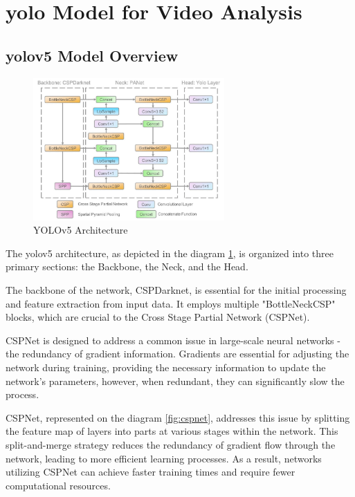 \section{\ac{yolo} Model for Video Analysis}
\subsection{\ac{yolo}v5 Model Overview}
\begin{figure}[h]
    \centering 
    \includegraphics[width=0.65\textwidth]{figs/yolov5-architecture2.png} 
    \caption{YOLOv5 Architecture}
    \label{fig:yolov5-architecture}
\end{figure}
The \ac{yolo}v5 architecture, as depicted in the diagram \ref{fig:yolov5-architecture}, is organized into 
three primary sections: the Backbone, the Neck, and the Head.

The backbone of the network, CSPDarknet, is essential for the initial processing and feature extraction from input data.
It employs multiple "BottleNeckCSP" blocks, which are crucial to the Cross Stage Partial Network (CSPNet). 

CSPNet is designed to address a common issue in large-scale neural networks - the redundancy of gradient information. 
Gradients are essential for adjusting the network during training, providing the necessary information to update 
the network's parameters, however, when redundant, they can significantly slow the process.

CSPNet, represented on the diagram \ref{fig:cspnet}, addresses this issue by splitting the feature map of layers 
into parts at various stages within the network.
This split-and-merge strategy reduces the redundancy of gradient flow through the network, leading to more efficient 
learning processes. As a result, networks utilizing CSPNet can achieve faster training times and require fewer 
computational resources.

